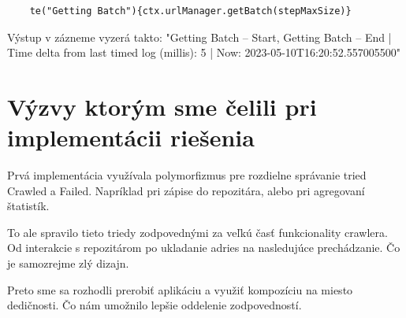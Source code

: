 \begin{lstlisting}
    te("Getting Batch"){ctx.urlManager.getBatch(stepMaxSize)}
\end{lstlisting}

Výstup v zázneme vyzerá takto:  "Getting Batch -- Start,
    Getting Batch -- End | Time delta from last timed log (millis): 5 | Now: 2023-05-10T16:20:52.557005500"



\section{Výzvy ktorým sme čelili pri implementácii riešenia}
Prvá implementácia využívala polymorfizmus pre rozdielne správanie tried Crawled a Failed. Napríklad pri zápise do repozitára, alebo pri agregovaní štatistík. 

To ale spravilo tieto triedy zodpovednými za veľkú časť funkcionality crawlera. Od interakcie s repozitárom po ukladanie adries na nasledujúce prechádzanie. Čo je samozrejme zlý dizajn. 

Preto sme sa rozhodli prerobiť aplikáciu a využiť kompozíciu na miesto dedičnosti. Čo nám umožnilo lepšie oddelenie zodpovedností. 